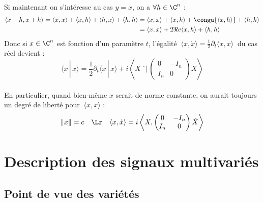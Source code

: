 Si maintenant on s'intéresse au cas $y=x$, on a $\forall h\in\C^n$ :
\begin{align*}
\langle x+h, x+h \rangle = \langle x, x \rangle + \langle x, h \rangle + \langle h, x \rangle + \langle h, h \rangle 
&= \langle x, x \rangle + \langle x, h \rangle  + \congu{\langle x, h \rangle }+ \langle h, h \rangle \\
&= \langle x, x \rangle + 2\Re e \langle x, h \rangle + \langle h, h \rangle
\end{align*}
Donc si $x\in\C^n$ est fonction d'un paramètre $t$, l'égalité $\ \langle x, \dot{x} \rangle = \frac{1}{2}\partial_t\langle x, x \rangle\ $ du cas réel devient :
\begin{equation}\label{eq:x_scal_dotx}
\langle x\,|\, \dot{x} \rangle = \frac{1}{2}\partial_t\langle x\,|\, x \rangle + i\left\langle X\,´\Big|\,\begin{pmatrix} 0 & -I_n \\ I_n & 0 \end{pmatrix}\dot{X}\right\rangle
\end{equation}
\\
En particulier, quand bien-même $x$ serait de norme constante, on aurait toujours un degré de liberté pour $\ \langle x, \dot{x} \rangle$ :
\[\|x\|=c\quad \Lr\quad \langle x, \dot{x} \rangle = i\left\langle X,\begin{pmatrix} 0 & -I_n \\ I_n & 0 \end{pmatrix}\dot{X}\right\rangle\]




\section{Description des signaux multivariés}\label{sec:bases}



\subsection{Point de vue des variétés}\label{subsec:phaseG_variete}

